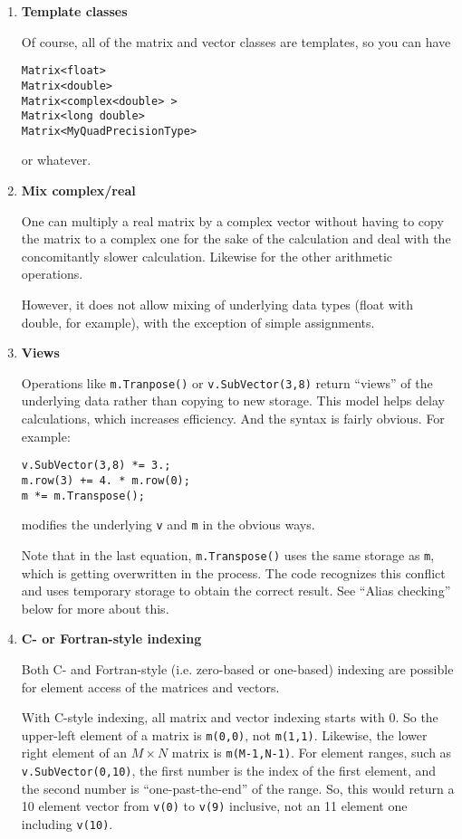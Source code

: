 \documentclass[twoside,letterpaper,11pt]{article}
\renewcommand{\tt}[1]{{\texttt {#1}}}
\begin{document}
\begin{enumerate}
\item
\textbf{Template classes}

Of course, all of the matrix and vector classes are templates, so you can have 
\begin{verbatim}
Matrix<float>
Matrix<double>
Matrix<complex<double> >
Matrix<long double>
Matrix<MyQuadPrecisionType>
\end{verbatim}
or whatever.

\item
\textbf{Mix complex/real}

One can multiply a real matrix by a complex
vector without having to copy the matrix to a complex one for the sake of the calculation
and deal with the concomitantly slower calculation.  
Likewise for the other arithmetic operations.  

However, it does not allow mixing of underlying data types 
(float with double, for example), 
with the exception of simple assignments.

\item
\textbf{Views}

Operations like \tt{m.Tranpose()} or \tt{v.SubVector(3,8)}
return ``views'' of the underlying data rather than copying to new storage.  
This model helps delay calculations, which increases efficiency.  And the syntax
is fairly obvious.  For example:
\begin{verbatim}
v.SubVector(3,8) *= 3.;
m.row(3) += 4. * m.row(0);
m *= m.Transpose();
\end{verbatim}
modifies the underlying \tt{v} and \tt{m} in the obvious ways.

Note that in the last equation, \tt{m.Transpose()} uses the same storage as
\tt{m}, which is getting overwritten in the process.  The code recognizes 
this conflict and uses temporary storage to obtain the correct result.
See ``Alias checking'' below for more about this.

\item
\textbf{C- or Fortran-style indexing}

Both C- and Fortran-style (i.e. zero-based or one-based) indexing are possible for
element access of the matrices and vectors.

With C-style indexing, all matrix and vector indexing starts with 0.  
So the upper-left element of a matrix is \tt{m(0,0)}, not \tt{m(1,1)}. 
Likewise, the lower right element of an $M \times N$ matrix is \tt{m(M-1,N-1)}.
For element ranges, such as \tt{v.SubVector(0,10)}, the first number is the 
index of the first element, and the second number is ``one-past-the-end'' of 
the range.  So, this would return a 10 element vector from \tt{v(0)} to
\tt{v(9)} inclusive, not an 11 element one including \tt{v(10)}.


\end{enumerate}
\end{document}
